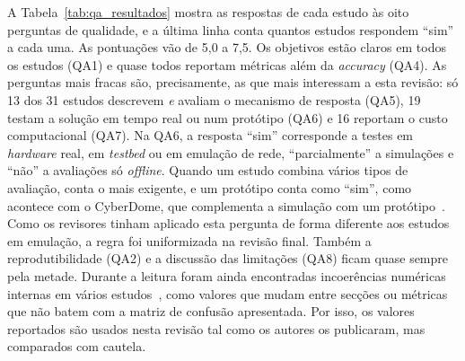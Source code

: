 \documentclass[conference,a4paper]{IEEEtran}
\begin{document}
A Tabela~\ref{tab:qa_resultados} mostra as respostas de cada estudo às oito perguntas de
qualidade, e a última linha conta quantos estudos respondem ``sim'' a cada uma. As
pontuações vão de 5,0 a 7,5. Os objetivos estão claros em todos os estudos (QA1) e quase
todos reportam métricas além da \textit{accuracy} (QA4). As perguntas mais fracas são,
precisamente, as que mais interessam a esta revisão: só 13 dos 31 estudos descrevem
\emph{e} avaliam o mecanismo de resposta (QA5), 19 testam a solução em tempo real ou num
protótipo (QA6) e 16 reportam o custo computacional (QA7). Na QA6, a resposta ``sim''
corresponde a testes em \textit{hardware} real, em \textit{testbed} ou em emulação de rede,
``parcialmente'' a simulações e ``não'' a avaliações só \textit{offline}. Quando um
estudo combina vários tipos de avaliação, conta o mais exigente, e um protótipo conta
como ``sim'', como acontece com o CyberDome, que complementa a simulação com um
protótipo~\cite{karibandi2025cyberdome}. Como os revisores tinham aplicado esta pergunta
de forma diferente aos estudos em emulação, a regra foi uniformizada na revisão final. Também a reprodutibilidade
(QA2) e a discussão das limitações (QA8) ficam quase sempre pela metade. Durante a
leitura foram ainda encontradas incoerências numéricas internas em vários
estudos~\cite{elsayed2024mpguard,ibrahim2026purechain,andrade2024ddos,dange2025dual,hussain2026postquantum,premakumari2025qlearning,kumar2025advanced},
como valores que mudam entre secções ou métricas que não batem com a matriz de confusão
apresentada. Por isso, os valores reportados são usados nesta revisão tal como os
autores os publicaram, mas comparados com cautela.
\end{document}
